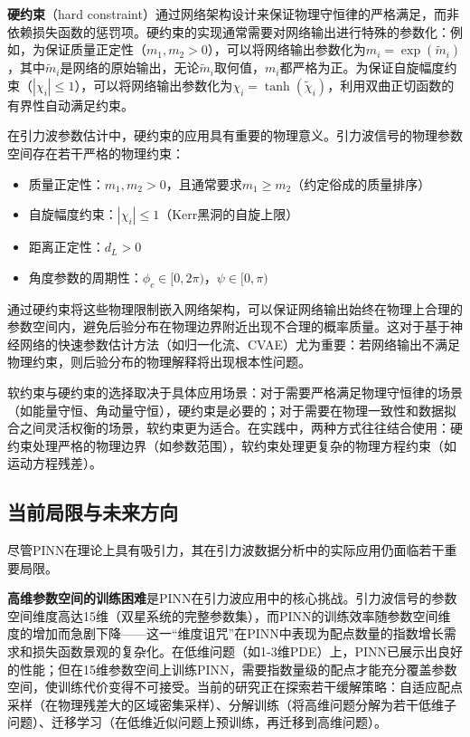 \textbf{硬约束}（hard constraint）通过网络架构设计来保证物理守恒律的严格满足，而非依赖损失函数的惩罚项。硬约束的实现通常需要对网络输出进行特殊的参数化：例如，为保证质量正定性（$m_1, m_2 > 0$），可以将网络输出参数化为$m_i = \exp(\tilde{m}_i)$，其中$\tilde{m}_i$是网络的原始输出，无论$\tilde{m}_i$取何值，$m_i$都严格为正。为保证自旋幅度约束（$|\chi_i| \leq 1$），可以将网络输出参数化为$\chi_i = \tanh(\tilde{\chi}_i)$，利用双曲正切函数的有界性自动满足约束。

在引力波参数估计中，硬约束的应用具有重要的物理意义。引力波信号的物理参数空间存在若干严格的物理约束：
\begin{itemize}
\item 质量正定性：$m_1, m_2 > 0$，且通常要求$m_1 \geq m_2$（约定俗成的质量排序）
\item 自旋幅度约束：$|\chi_i| \leq 1$（Kerr黑洞的自旋上限）
\item 距离正定性：$d_L > 0$
\item 角度参数的周期性：$\phi_c \in [0, 2\pi)$，$\psi \in [0, \pi)$
\end{itemize}
通过硬约束将这些物理限制嵌入网络架构，可以保证网络输出始终在物理上合理的参数空间内，避免后验分布在物理边界附近出现不合理的概率质量。这对于基于神经网络的快速参数估计方法（如归一化流、CVAE）尤为重要：若网络输出不满足物理约束，则后验分布的物理解释将出现根本性问题。

软约束与硬约束的选择取决于具体应用场景：对于需要严格满足物理守恒律的场景（如能量守恒、角动量守恒），硬约束是必要的；对于需要在物理一致性和数据拟合之间灵活权衡的场景，软约束更为适合。在实践中，两种方式往往结合使用：硬约束处理严格的物理边界（如参数范围），软约束处理更复杂的物理方程约束（如运动方程残差）。

\subsection*{当前局限与未来方向}

尽管PINN在理论上具有吸引力，其在引力波数据分析中的实际应用仍面临若干重要局限。

\textbf{高维参数空间的训练困难}是PINN在引力波应用中的核心挑战。引力波信号的参数空间维度高达15维（双星系统的完整参数集），而PINN的训练效率随参数空间维度的增加而急剧下降——这一“维度诅咒”在PINN中表现为配点数量的指数增长需求和损失函数景观的复杂化。在低维问题（如1-3维PDE）上，PINN已展示出良好的性能；但在15维参数空间上训练PINN，需要指数量级的配点才能充分覆盖参数空间，使训练代价变得不可接受。当前的研究正在探索若干缓解策略：自适应配点采样（在物理残差大的区域密集采样）、分解训练（将高维问题分解为若干低维子问题）、迁移学习（在低维近似问题上预训练，再迁移到高维问题）。

